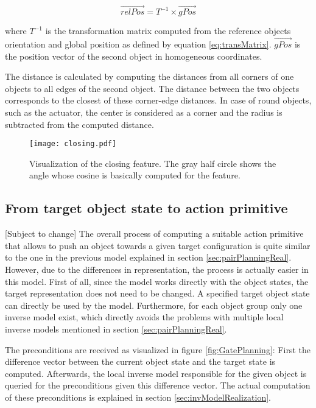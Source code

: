\begin{equation}
	\vec{relPos} = T^{-1} \times \vec{gPos}
\label{eq:trans}
\end{equation}

where $T^{-1}$ is the transformation matrix computed from the reference objects orientation and global position as defined by equation \ref{eq:transMatrix}. $\vec{gPos}$ is the position vector of the second object in homogeneous coordinates. 

The distance is calculated by computing the distances from all corners of one objects to all edges of the second object. 
The distance between the two objects corresponds to the closest of these corner-edge distances. In case of round objects, such as the actuator, the center is considered as a corner and the radius is subtracted from the computed distance.

\begin{figure}
	\centering
	\texttt{[image: closing.pdf]}
	\caption{Visualization of the closing feature. The gray half circle shows the angle whose cosine is basically computed for the feature.} 
	\label{fig:closing}
\end{figure} %

\subsection{From target object state to action primitive \label{sec:gatePlanningReal}}
[Subject to change]
The overall process of computing a suitable action primitive that allows to push an object towards a given target configuration is quite similar to the one in the previous model explained in section \ref{sec:pairPlanningReal}. However, due to the differences in representation, the process is actually easier in this model. 
First of all, since the model works directly with the object states, the target representation does not need to be changed. A specified target object state can directly be used by the model. 
Furthermore, for each object group only one inverse model exist, which directly avoids the problems with multiple local inverse models mentioned in section \ref{sec:pairPlanningReal}. 

The preconditions are received as visualized in figure \ref{fig:GatePlanning}: 
First the difference vector between the current object state and the target state is computed. Afterwards, the local inverse model responsible for the given object is queried for the preconditions given this difference vector. The actual computation of these preconditions is explained in section \ref{sec:invModelRealization}.

